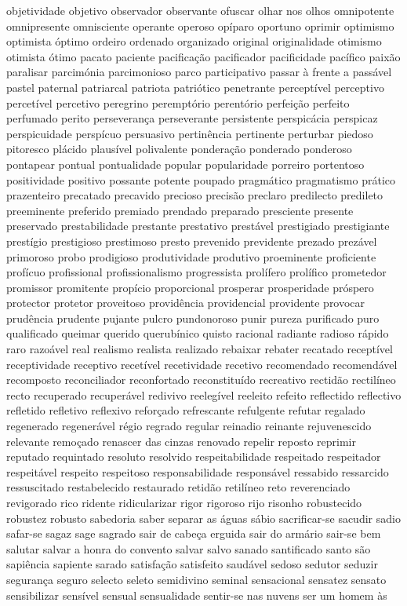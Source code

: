 \begin{appendices}
objetividade objetivo observador observante ofuscar olhar nos olhos omnipotente omnipresente omnisciente operante operoso op\'{i}paro oportuno oprimir optimismo optimista \'{o}ptimo ordeiro ordenado organizado original originalidade otimismo otimista \'{o}timo pacato paciente pacifica\c{c}\~ao pacificador pacificidade pac\'{i}fico paix\~ao paralisar parcim\'{o}nia parcimonioso parco participativo passar \`{a} frente a pass\'{a}vel pastel paternal patriarcal patriota patri\'{o}tico penetrante percept\'{i}vel perceptivo percet\'{i}vel percetivo peregrino perempt\'{o}rio perent\'{o}rio perfei\c{c}\~ao perfeito perfumado perito perseveran\c{c}a perseverante persistente perspic\'{a}cia perspicaz perspicuidade persp\'{i}cuo persuasivo pertin\^{e}ncia pertinente perturbar piedoso pitoresco pl\'{a}cido plaus\'{i}vel polivalente pondera\c{c}\~ao ponderado ponderoso pontapear pontual pontualidade popular popularidade porreiro portentoso positividade positivo possante potente poupado pragm\'{a}tico pragmatismo pr\'{a}tico prazenteiro precatado precavido precioso precis\~ao preclaro predilecto predileto preeminente preferido premiado prendado preparado presciente presente preservado prestabilidade prestante prestativo prest\'{a}vel prestigiado prestigiante prest\'{i}gio prestigioso prestimoso presto prevenido previdente prezado prez\'{a}vel primoroso probo prodigioso produtividade produtivo proeminente proficiente prof\'{i}cuo profissional profissionalismo progressista prol\'{i}fero prol\'{i}fico prometedor promissor promitente prop\'{i}cio proporcional prosperar prosperidade pr\'{o}spero protector protetor proveitoso provid\^{e}ncia providencial providente provocar prud\^{e}ncia prudente pujante pulcro pundonoroso punir pureza purificado puro qualificado queimar querido querub\'{i}nico quisto racional radiante radioso r\'{a}pido raro razo\'{a}vel real realismo realista realizado rebaixar rebater recatado recept\'{i}vel receptividade receptivo recet\'{i}vel recetividade recetivo recomendado recomend\'{a}vel recomposto reconciliador reconfortado reconstitu\'{i}do recreativo rectid\~ao rectil\'{i}neo recto recuperado recuper\'{a}vel redivivo reeleg\'{i}vel reeleito refeito reflectido reflectivo refletido refletivo reflexivo refor\c{c}ado refrescante refulgente refutar regalado regenerado regener\'{a}vel r\'{e}gio regrado regular reinadio reinante rejuvenescido relevante remo\c{c}ado renascer das cinzas renovado repelir reposto reprimir reputado requintado resoluto resolvido respeitabilidade respeitado respeitador respeit\'{a}vel respeito respeitoso responsabilidade respons\'{a}vel ressabido ressarcido ressuscitado restabelecido restaurado retid\~ao retil\'{i}neo reto reverenciado revigorado rico ridente ridicularizar rigor rigoroso rijo risonho robustecido robustez robusto sabedoria saber separar as \'{a}guas s\'{a}bio sacrificar-se sacudir sadio safar-se sagaz sage sagrado sair de cabe\c{c}a erguida sair do arm\'{a}rio sair-se bem salutar salvar a honra do convento salvar salvo sanado santificado santo s\~ao sapi\^{e}ncia sapiente sarado satisfa\c{c}\~ao satisfeito saud\'{a}vel sedoso sedutor seduzir seguran\c{c}a seguro selecto seleto semidivino seminal sensacional sensatez sensato sensibilizar sens\'{i}vel sensual sensualidade sentir-se nas nuvens ser um homem \`{a}s 
\end{appendices}
